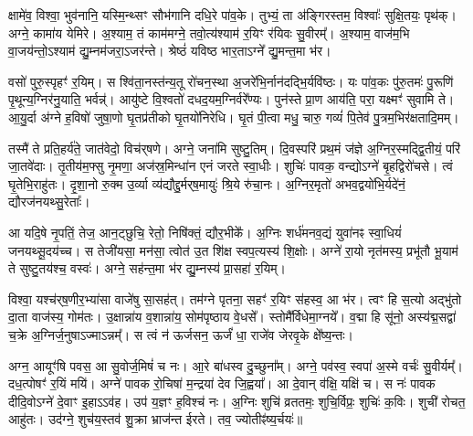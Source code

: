 क्षामे॑व॒ विश्वा॒ भुव॑नानि॒ यस्मि॒न्थ्सꣳ सौभ॑गानि दधि॒रे पा॑व॒के। तुभ्यं॒ ता अ॑ङ्गिरस्तम॒ विश्वाः᳚ सुक्षि॒तयः॒ पृथ॑क्। अग्ने॒ कामा॑य येमिरे। अ॒श्याम॒ तं काम॑मग्ने॒ तवो॒त्य॑श्याम॑ र॒यिꣳ र॑यिवः सु॒वीरम्᳚। अ॒श्याम॒ वाज॑म॒भि वा॒जय॑न्तो॒ऽश्याम॑ द्यु॒म्नम॑जरा॒ऽजर॑न्ते। श्रेष्ठं॑ यविष्ठ भार॒ताऽग्ने᳚ द्यु॒मन्त॒मा भ॑र।

वसो॑ पुरु॒स्पृहꣳ॑ र॒यिम्। स श्वि॑ता॒नस्त॑न्य॒तू रो॑चन॒स्था अ॒जरे॑भि॒र्नान॑दद्भि॒र्यवि॑ष्ठः। यः पा॑व॒कः पु॑रु॒तमः॑ पु॒रूणि॑ पृ॒थून्य॒ग्निर॑नु॒याति॒ भर्वन्न्॑। आयु॑ष्टे वि॒श्वतो॑ दधद॒यम॒ग्निर्वरे᳚ण्यः। पुन॑स्ते प्रा॒ण आय॑ति॒ परा॒ यक्ष्मꣳ॑ सुवामि ते। आ॒यु॒र्दा अ॑ग्ने ह॒विषो॑ जुषा॒णो घृ॒तप्र॑तीको घृ॒तयो॑निरेधि। घृ॒तं पी॒त्वा मधु॒ चारु॒ गव्यं॑ पि॒तेव॑ पु॒त्रम॒भिर॑क्षतादि॒मम्।

तस्मै॑ ते प्रति॒हर्य॑ते॒ जात॑वेदो॒ विच॑र्‌षणे। अग्ने॒ जना॑मि सुष्टु॒तिम्। दि॒वस्परि॑ प्रथ॒मं ज॑ज्ञे अ॒ग्निर॒स्मद्द्वि॒तीयं॒ परि॑ जा॒तवे॑दाः। तृ॒तीय॑म॒फ्सु नृ॒मणा॒ अज॑स्र॒मिन्धा॑न एनं जरते स्वा॒धीः। शुचिः॑ पावक॒ वन्द्योऽग्ने॑ बृ॒हद्विरो॑चसे। त्वं घृ॒तेभि॒राहु॑तः। दृ॒शा॒नो रु॒क्म उ॒र्व्या व्य॑द्यौद्दु॒र्मर्‌ष॒मायुः॑ श्रि॒ये रु॑चा॒नः। अ॒ग्निर॒मृतो॑ अभव॒द्वयो॑भि॒र्यदे॑नं॒ द्यौरज॑नयथ्सु॒रेताः᳚।

आ यदि॒षे नृ॒पतिं॒ तेज॒ आन॒ट्छुचि॒ रेतो॒ निषि॑क्तं॒ द्यौर॒भीके᳚।
अ॒ग्निः शर्ध॑मनव॒द्यं युवा॑नꣴ स्वा॒धियं॑ जनयथ्सू॒दय॑च्च। स तेजी॑यसा॒ मन॑सा॒ त्वोत॑ उ॒त शि॑क्ष स्वप॒त्यस्य॑ शि॒क्षोः। अग्ने॑ रा॒यो नृत॑मस्य॒ प्रभू॑तौ भू॒याम॑ ते सुष्टु॒तय॑श्च॒ वस्वः॑। अग्ने॒ सह॑न्त॒मा भ॑र द्यु॒म्नस्य॑ प्रा॒सहा॑ र॒यिम्।

विश्वा॒ यश्च॑र्‌ष॒णीर॒भ्या॑सा वाजे॑षु सा॒सह॑त्।
तम॑ग्ने पृतना॒ सहꣳ॑ र॒यिꣳ स॑हस्व॒ आ भ॑र। त्वꣳ हि स॒त्यो अद्भु॑तो दा॒ता वाज॑स्य॒ गोम॑तः। उ॒क्षान्ना॑य व॒शान्ना॑य॒ सोम॑पृष्ठाय वे॒धसे᳚। स्तोमै᳚र्विधेमा॒ग्नये᳚। व॒द्मा हि सू॑नो॒ अस्य॑द्म॒सद्वा॑ च॒क्रे अ॒ग्निर्ज॒नुषाऽज्माऽन्नम्᳚। स त्वं न॑ ऊर्जसन॒ ऊर्जं॑ धा॒ राजे॑व जेरवृ॒के क्षे᳚ष्य॒न्तः।

अग्न॒ आयूꣳ॑षि पवस॒ आ सु॒वोर्ज॒मिषं॑ च नः। आ॒रे बा॑धस्व दु॒च्छुना᳚म्। अग्ने॒ पव॑स्व॒ स्वपा॑ अ॒स्मे वर्चः॑ सु॒वीर्यम्᳚। दध॒त्पोषꣳ॑ र॒यिं मयि॑।
अग्ने॑ पावक रो॒चिषा॑ म॒न्द्रया॑ देव जि॒ह्वया᳚। आ दे॒वान् व॑क्षि॒ यक्षि॑ च। स नः॑ पावक दीदि॒वोऽग्ने॑ दे॒वाꣳ इ॒हाऽऽव॑ह। उप॑ य॒ज्ञꣳ ह॒विश्च॑ नः। अ॒ग्निः शुचि॑ व्रततमः॒ शुचि॒र्विप्रः॒ शुचिः॑ क॒विः। शुची॑ रोचत॒ आहु॑तः। उद॑ग्ने॒ शुच॑य॒स्तव॑ शु॒क्रा भ्राज॑न्त ईरते। तव॒ ज्योतीꣴ॑ष्य॒र्चयः॑॥

